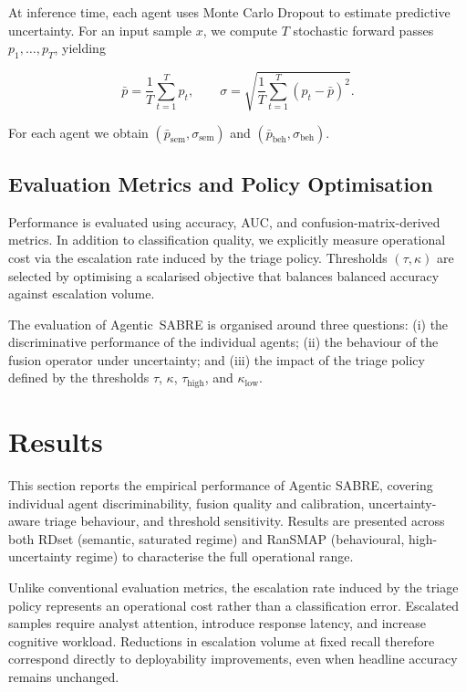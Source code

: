 \documentclass[lettersize,journal]{IEEEtran}
\begin{document}
At inference time, each agent uses Monte Carlo Dropout to estimate predictive
uncertainty. For an input sample $x$, we compute $T$ stochastic forward passes
$p_1, \ldots, p_T$, yielding

\begin{equation}
\bar{p} = \frac{1}{T}\sum_{t=1}^T p_t, \qquad
\sigma = \sqrt{\frac{1}{T}\sum_{t=1}^{T} (p_t - \bar{p})^2}.
\end{equation}

For each agent we obtain $(\bar{p}_{\text{sem}}, \sigma_{\text{sem}})$ and
$(\bar{p}_{\text{beh}}, \sigma_{\text{beh}})$.

\subsection{Evaluation Metrics and Policy Optimisation}

Performance is evaluated using accuracy, AUC, and confusion-matrix-derived
metrics. In addition to classification quality, we explicitly measure
operational cost via the escalation rate induced by the triage policy.
Thresholds $(\tau,\kappa)$ are selected by optimising a scalarised objective
that balances balanced accuracy against escalation volume.

The evaluation of Agentic~SABRE is organised around three questions:  
(i) the discriminative performance of the individual agents;  
(ii) the behaviour of the fusion operator under uncertainty; and  
(iii) the impact of the triage policy defined by the thresholds \(\tau\), \(\kappa\), \(\tau_{\mathrm{high}}\), and \(\kappa_{\mathrm{low}}\).

\section{Results}
\label{sec:results}

This section reports the empirical performance of Agentic SABRE, covering individual agent
discriminability, fusion quality and calibration, uncertainty-aware triage behaviour, and
threshold sensitivity. Results are presented across both RDset (semantic, saturated regime)
and RanSMAP (behavioural, high-uncertainty regime) to characterise the full operational range.

Unlike conventional evaluation metrics, the escalation rate induced by the triage policy represents an operational cost rather than a classification error. Escalated samples require analyst attention, introduce response latency, and increase cognitive workload. Reductions in escalation volume at fixed recall therefore correspond directly to deployability improvements, even when headline accuracy remains unchanged.
\end{document}
